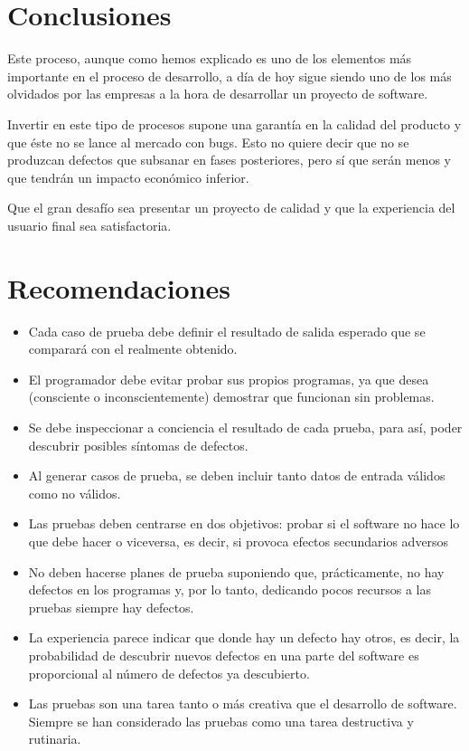 \documentclass{article}
\begin{document}
\section{Conclusiones}

Este proceso, aunque como hemos explicado es uno de los elementos más importante en el proceso de desarrollo, a día de hoy sigue siendo uno de los más olvidados por las empresas a la hora de desarrollar un proyecto de software.

Invertir en este tipo de procesos supone una garantía en la calidad del producto y que éste no se lance al mercado con bugs. Esto no quiere decir que no se produzcan defectos que subsanar en fases posteriores, pero sí que serán menos y que tendrán un impacto económico inferior.

Que el gran desafío sea presentar un proyecto de calidad y que la experiencia del usuario final sea satisfactoria.

\section{Recomendaciones}

\begin{itemize}
    \item Cada caso de prueba debe definir el resultado de salida esperado que se comparará con el realmente obtenido.
    \item El programador debe evitar probar sus propios programas, ya que desea (consciente o inconscientemente) demostrar que funcionan sin problemas.
    \item Se debe inspeccionar a conciencia el resultado de cada prueba, para así­, poder descubrir posibles síntomas de defectos.
    \item Al generar casos de prueba, se deben incluir tanto datos de entrada válidos como no válidos.
    \item Las pruebas deben centrarse en dos objetivos: probar si el software no hace lo que debe hacer o viceversa, es decir, si provoca efectos secundarios adversos
    \item No deben hacerse planes de prueba suponiendo que, prácticamente, no hay defectos en los programas y, por lo tanto, dedicando pocos recursos a las pruebas siempre hay defectos.
    \item La experiencia parece indicar que donde hay un defecto hay otros, es decir, la probabilidad de descubrir nuevos defectos en una parte del software es proporcional al número de defectos ya descubierto.
    \item Las pruebas son una tarea tanto o más creativa que el desarrollo de software. Siempre se han considerado las pruebas como una tarea destructiva y rutinaria.
\end{itemize} 
\end{document}
